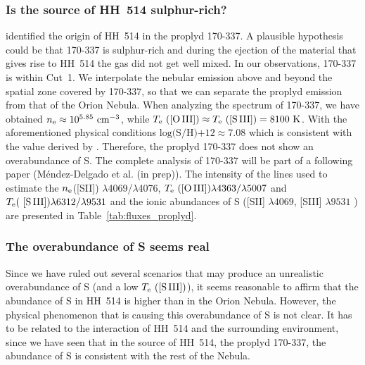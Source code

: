 \documentclass[fleqn,usenatbib]{mnras}
\begin{document}
\subsubsection{Is the source of HH~514 sulphur-rich?}
\label{subsec:proplyd}

\citet{bally00} identified the origin of HH~514 in the proplyd 170-337. A plausible hypothesis could be that 170-337 is sulphur-rich and during the ejection of the material that gives rise to HH~514 the gas did not get well mixed. In our observations, 170-337 is within Cut~1. We interpolate the nebular emission above and beyond the spatial zone covered by 170-337, so that we can separate the proplyd emission from that of the Orion Nebula. When analyzing the spectrum of 170-337, we have obtained  $n_{\rm e}\approx 10^{5.85} \text{ cm}^{-3}$, while $T_{\rm e} \text{ ([O\thinspace III])} \approx T_{\rm e} \text{ ([S\thinspace III])}=8100 \text{ K}$. With the aforementioned physical conditions $\text{log(S/H)+12} \approx 7.08$ which is consistent with the value derived by \citet{mendez2021-2}. Therefore, the proplyd 170-337 does not show an overabundance of S. The complete analysis of 170-337 will be part of a following paper (M\'endez-Delgado et al. (in prep)). The intensity of the lines used to estimate the $n_{\rm e}$([S\thinspace II]) $\lambda$4069/$\lambda$4076, $T_{\rm e} \text{ ([O\thinspace III])} \lambda4363/\lambda5007$ and $T_{\rm e} (\text{ [S\thinspace III])} \lambda6312/\lambda9531$  and the ionic abundances of S ([S\thinspace II] $\lambda 4069$, [S\thinspace III] $\lambda 9531$ ) are presented in Table~\ref{tab:fluxes_proplyd}.


\subsubsection{The overabundance of S seems real}
\label{subsec:real_overabundance}

Since we have ruled out several scenarios that may produce an unrealistic overabundance of S (and a low $T_{\rm e} \text{ ([S\thinspace III])}$), it seems reasonable to affirm that the abundance of S in HH~514 is higher than in the Orion Nebula. However, the physical phenomenon that is causing this overabundance of S is not clear. It has to be related to the interaction of HH~514 and the surrounding environment, since we have seen that in the source of HH~514, the proplyd 170-337, the abundance of S is consistent with the rest of the Nebula. %
\end{document}
